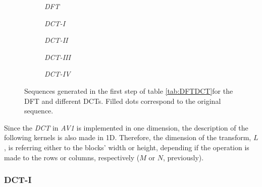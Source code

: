 \begin{figure}[t!]
    \centering 
        \begin{subfigure}[c]{\textwidth}
            \centering
            
            \caption{\emph{DFT}}
            \label{subfig:dft}
        \end{subfigure}
        \begin{subfigure}[c]{0.45\textwidth}
            \centering
            
            \caption{\emph{DCT-I}}
            \label{subfig:dct1}
        \end{subfigure}
        \begin{subfigure}[c]{0.45\textwidth}
            \centering
            
            \caption{\emph{DCT-II}}
            \label{subfig:dct2}
        \end{subfigure}
        \begin{subfigure}[c]{0.45\textwidth}
            \centering
            
            \caption{\emph{DCT-III}}
            \label{subfig:dct3}
        \end{subfigure}
        \begin{subfigure}[c]{0.45\textwidth}
            \centering
            
            \caption{\emph{DCT-IV}}
            \label{subfig:dct4}
        \end{subfigure}
        \caption{Sequences generated in the first step of table \ref{tab:DFTDCT}for the DFT and different DCTs. Filled dots correspond to the original sequence.}
    \label{fig:2NSeq}
\end{figure}


Since the \emph{DCT} in \emph{AV1} is implemented in one dimension, the description of the following kernels is also made in 1D. Therefore, the dimension of the transform, $L$, is referring either to the blocks' width or height, depending if the operation is made to the rows or columns, respectively ($M$ or $N$, previously).

\subsubsection{DCT-I}

